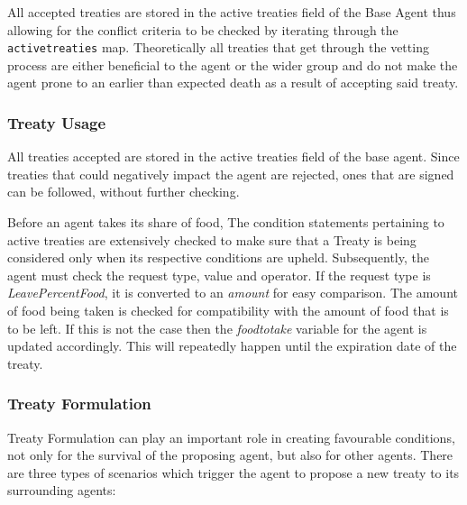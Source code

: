 All accepted treaties are stored in the active treaties field of the Base Agent thus allowing for the conflict criteria to be checked by iterating through the \texttt{activetreaties} map. Theoretically all treaties that get through the vetting process are either beneficial to the agent or the wider group and do not make the agent prone to an earlier than expected death as a result of accepting said treaty.

\subsubsection{Treaty Usage}
\label{subsec: Treaty Usage}
All treaties accepted are stored in the active treaties field of the base agent. Since treaties that could negatively impact the agent are rejected, ones that are signed can be followed, without further checking. 

Before an agent takes its share of food, The condition statements pertaining to active treaties are extensively checked to make sure that a Treaty is being considered only when its respective conditions are upheld. Subsequently, the agent must check the request type, value and operator. If the request type is \textit{LeavePercentFood}, it is converted to an \textit{amount} for easy comparison. 
The amount of food being taken is checked for compatibility with the amount of food that is to be left. If this is not the case then the \textit{foodtotake} variable for the agent is updated accordingly.
This will repeatedly happen until the expiration date of the treaty.

\subsubsection{Treaty Formulation}
\label{subsec: Treaty Formulation}
Treaty Formulation can play an important role in creating favourable conditions, not only for the survival of the proposing agent, but also for other agents. There are three types of scenarios which trigger the agent to propose a new treaty to its surrounding agents:

